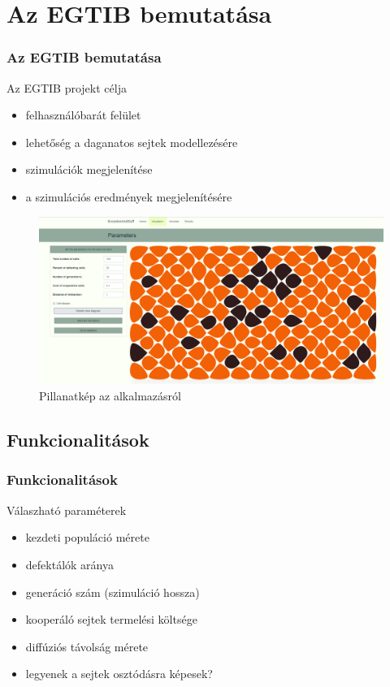 \section{Az EGTIB bemutatása}
\begin{frame}
	\frametitle{Az EGTIB bemutatása}
	\begin{block}{Az EGTIB projekt célja}
		\begin{itemize}
			\item felhasználóbarát felület
			\item lehetőség a daganatos sejtek modellezésére 
			\item szimulációk megjelenítése
			\pause
			\item a szimulációs eredmények megjelenítésére
		\end{itemize}
	\end{block}

	\begin{figure}[ht!]
		\centering
		\includegraphics[width=0.6\linewidth]{images/voronoi_page.png}
		\caption{Pillanatkép az alkalmazásról}
		\label{fig:SimulateWithDiagram}
	\end{figure}
\end{frame}

\subsection{Funkcionalitások}
\begin{frame}
	\frametitle{Funkcionalitások}
	\begin{block}{Válaszható paraméterek}
		\begin{itemize}
			\item kezdeti populáció mérete
			\item defektálók aránya 
			\item generáció szám (szimuláció hossza)
			\item kooperáló sejtek termelési költsége 
			\item diffúziós távolság mérete
			\item legyenek a sejtek osztódásra képesek?
		\end{itemize}
	\end{block}
\end{frame}


